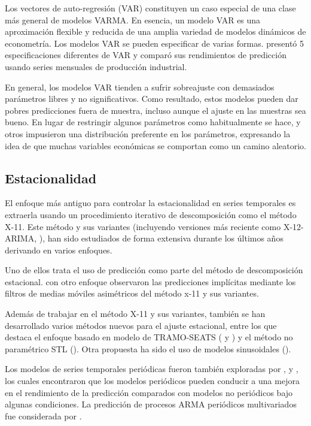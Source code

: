 \documentclass{llncs}
\begin{document}
Los vectores de auto-regresión (VAR) constituyen un caso especial de una clase más general de modelos VARMA. En esencia, un modelo VAR es una aproximación flexible y reducida de una amplia variedad de modelos dinámicos de econometría. Los modelos VAR se pueden especificar de varias formas. \cite{Funke1990363} presentó 5 especificaciones diferentes de VAR y comparó sus rendimientos de predicción usando series mensuales de producción industrial.

En general, los modelos VAR tienden a sufrir sobreajuste con demasiados parámetros libres y no significativos. Como resultado, estos modelos pueden dar pobres predicciones fuera de muestra, incluso aunque el ajuste en las muestras sea bueno. En lugar de restringir algunos parámetros como habitualmente se hace, \cite{Litterman198625} y otros impusieron una distribución preferente en los parámetros, expresando la idea de que muchas variables económicas se comportan como un camino aleatorio. 

\subsection{Estacionalidad}
El enfoque más antiguo para controlar la estacionalidad en series temporales es extraerla usando un procedimiento iterativo de descomposición como el método X-11. Este método y sus variantes (incluyendo versiones más reciente como X-12-ARIMA, \cite{Findley1998127}), han sido estudiados de forma extensiva durante los últimos años derivando en varios enfoques.

Uno de ellos trata el uso de predicción como parte del método de descomposición estacional. \cite{Quenneville2003727} con otro enfoque observaron las predicciones implícitas mediante los filtros de medias móviles asimétricos del método x-11 y sus variantes. 

Además de trabajar en el método X-11 y sus variantes, también se han desarrollado varios métodos nuevos para el ajuste estacional, entre los que destaca el enfoque basado en modelo de TRAMO-SEATS (\cite{Gomez2001} y \cite{Kaiser2005691}) y el método no paramétrico STL (\cite{Cleveland19903}). Otra propuesta ha sido el uso de modelos sinusoidales (\cite{Simmons1990485}).

Los modelos de series temporales periódicas fueron también exploradas por \cite{Wells1997407}, \cite{Herwartz1997421} y \cite{Novales1997393}, los cuales encontraron que los modelos periódicos pueden conducir a una mejora en el rendimiento de la predicción comparados con modelos no periódicos bajo algunas condiciones. La predicción de procesos ARMA periódicos multivariados fue considerada por \cite{Ula1993645}.
\end{document}

